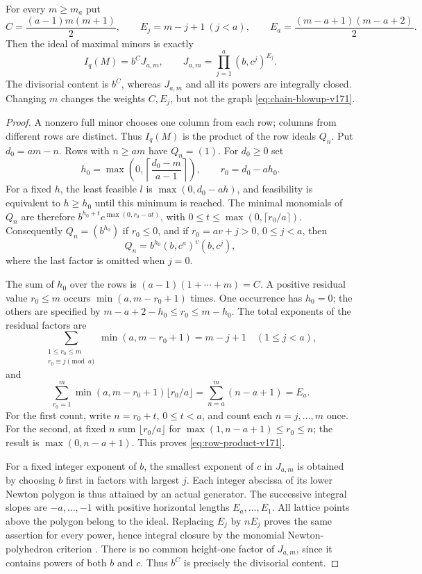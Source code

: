 \begin{proposition}
\label{prop:chain-factorization-v171}
For every $m\geq m_a$ put
\[
 C=\frac{(a-1)m(m+1)}2,\qquad
 E_j=m-j+1\ (j<a),\qquad
 E_a=\frac{(m-a+1)(m-a+2)}2.
\]
Then the ideal of maximal minors is exactly
\begin{equation}\label{eq:row-product-v171}
 I_q(M)=b^C J_{a,m},\qquad
 J_{a,m}=\prod_{j=1}^a(b,c^j)^{E_j}.
\end{equation}
The divisorial content is $b^C$, whereas $J_{a,m}$ and all its powers
are integrally closed. Changing $m$ changes the weights $C,E_j$, but
not the graph \eqref{eq:chain-blowup-v171}.
\end{proposition}
\begin{proof}
A nonzero full minor chooses one column from each row; columns from
different rows are distinct. Thus $I_q(M)$ is the product of the row
ideals $Q_n$. Put $d_0=am-n$. Rows with $n\geq am$ have $Q_n=(1)$.
For $d_0\geq0$ set
\[
 h_0=\max\left(0,\left\lceil\frac{d_0-m}{a-1}\right\rceil\right),
 \qquad r_0=d_0-ah_0.
\]
For a fixed $h$, the least feasible $l$ is $\max(0,d_0-ah)$, and
feasibility is equivalent to $h\geq h_0$ until this minimum is reached.
The minimal monomials of $Q_n$ are therefore
$b^{h_0+t}c^{\max(0,r_0-at)}$, with
$0\leq t\leq\max(0,\lceil r_0/a\rceil)$. Consequently $Q_n=(b^{h_0})$
if $r_0\leq0$, and if $r_0=av+j>0$, $0\leq j<a$, then
\[
 Q_n=b^{h_0}(b,c^a)^v(b,c^j),
\]
where the last factor is omitted when $j=0$.

The sum of $h_0$ over the rows is
$(a-1)(1+\cdots+m)=C$. A positive residual value $r_0\leq m$ occurs
$\min(a,m-r_0+1)$ times. One occurrence has $h_0=0$; the others are
specified by $m-a+2-h_0\leq r_0\leq m-h_0$. The total exponents of
the residual factors are
\[
 \sum_{\substack{1\leq r_0\leq m\\r_0\equiv j\pmod a}}
       \min(a,m-r_0+1)=m-j+1\quad(1\leq j<a),
\]
and
\[
 \sum_{r_0=1}^m\min(a,m-r_0+1)\lfloor r_0/a\rfloor
 =\sum_{n=a}^m(n-a+1)=E_a.
\]
For the first count, write $n=r_0+t$, $0\leq t<a$, and count each
$n=j,\ldots,m$ once. For the second, at fixed $n$ sum
$\lfloor r_0/a\rfloor$ for
$\max(1,n-a+1)\leq r_0\leq n$; the result is $\max(0,n-a+1)$.
This proves \eqref{eq:row-product-v171}.

For a fixed integer exponent of $b$, the smallest exponent of $c$
in $J_{a,m}$ is obtained by choosing $b$ first in factors with largest
$j$. Each integer abscissa of its lower Newton polygon is thus
attained by an actual generator. The successive integral slopes
are $-a,\ldots,-1$ with positive horizontal lengths $E_a,\ldots,E_1$.
All lattice points above the polygon belong to the ideal. Replacing
$E_j$ by $nE_j$ proves the same assertion for every power, hence
integral closure by the monomial Newton-polyhedron criterion
\cite[Proposition 1.4.6]{HunekeSwanson171}. There is no common
height-one factor of $J_{a,m}$, since it contains powers of both $b$
and $c$. Thus $b^C$ is precisely the divisorial content.
\end{proof}

